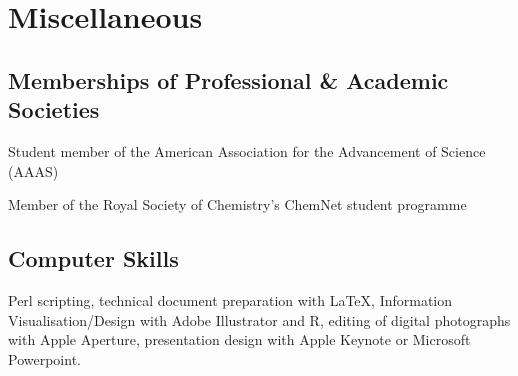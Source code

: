 \documentclass[letterpaper]{article}
\renewenvironment{itemize}{
  \begin{list}{}{
    \setlength{\leftmargin}{1.5em}
  }
}{
  \end{list}
}
\begin{document}



\section*{Miscellaneous}

\subsection*{Memberships of Professional \& Academic Societies}
\begin{itemize}
\item Student member of the American Association for the Advancement of Science (AAAS)
\item Member of the Royal Society of Chemistry's ChemNet student programme
\end{itemize}

\subsection*{Computer Skills}
Perl scripting, technical document preparation with \LaTeX, Information Visualisation/Design with Adobe Illustrator and R, editing of digital photographs with Apple Aperture, presentation design with Apple Keynote or Microsoft Powerpoint. 
\end{document}

